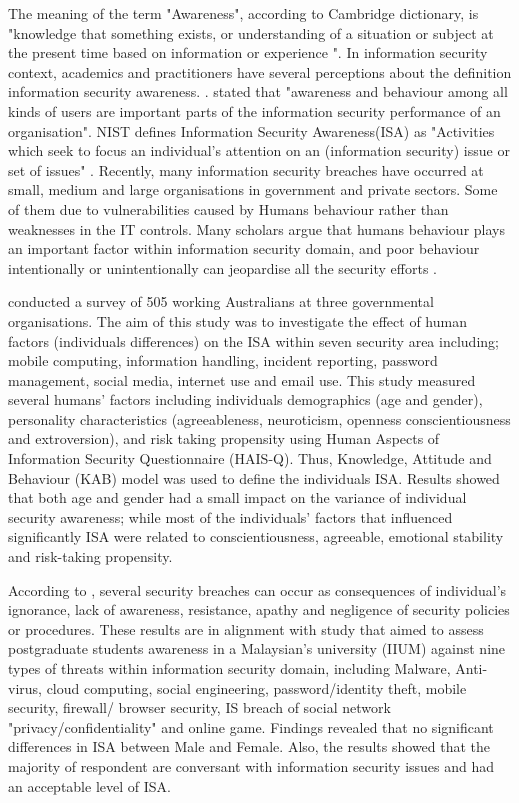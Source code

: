 The meaning of the term "Awareness", according to Cambridge dictionary, is "knowledge that something exists, or understanding of a situation or subject at the present time based on information or experience ".
In information security context, academics and practitioners have several perceptions about the definition information security awareness. \citet{Albrechtsen}. stated that "awareness and behaviour among all kinds of users are important parts of the information security performance of an organisation".  
NIST\cite{Kissel2013} defines Information Security Awareness(ISA) as "Activities which seek to focus an individual’s attention on an (information security) issue or set of issues" .  
Recently, many information security breaches have occurred at small, medium and large organisations in government and private sectors. Some of them due to vulnerabilities caused by Humans behaviour rather than  weaknesses in the IT controls. Many scholars argue that humans behaviour plays an important factor within information security domain, and poor behaviour intentionally or unintentionally can jeopardise all the security efforts \cite{Kruger2006,Butavicius2017,Bawazir2016,Giraldo2014,Lebek2013,McCormac2016,safa2015information,Benbasat2010a}.  

\citet{McCormac2016} conducted a survey of 505 working Australians at three governmental organisations. The aim of this study was to investigate the effect of human factors (individuals differences) on the ISA within seven security area including; mobile computing, information handling, incident reporting, password management, social media, internet use and email use. This study measured several humans' factors including individuals demographics (age and gender), personality characteristics (agreeableness, neuroticism, openness conscientiousness and extroversion), and risk taking propensity using Human Aspects of Information Security Questionnaire (HAIS-Q). Thus, Knowledge, Attitude and Behaviour (KAB) model was used to define the individuals ISA. Results showed that both age and gender had a small impact on the variance of individual security awareness; while most of the individuals' factors that  influenced significantly ISA were related to conscientiousness, agreeable, emotional stability and risk-taking propensity.

According to \citet{safa2015information}, several security breaches can occur as consequences of individual's ignorance, lack of awareness, resistance, apathy and negligence of security policies or procedures. 
These results are in alignment with  \citet{Hamid2014} study that aimed to assess postgraduate students awareness in a Malaysian's university (IIUM) against nine types of threats within information security domain, including Malware, Anti-virus, cloud computing, social engineering, password/identity theft, mobile security, firewall/ browser security, IS breach of social network "privacy/confidentiality" and online game. Findings revealed that no significant differences in ISA between Male and Female. Also, the results showed that the majority of respondent are conversant with information security issues and had an acceptable level of ISA. 

